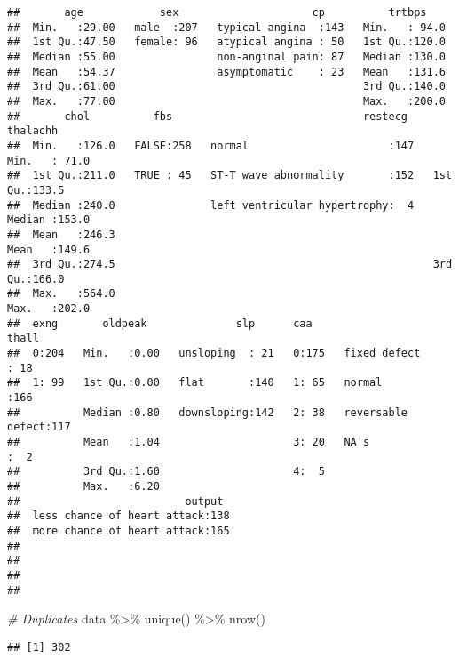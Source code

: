 \documentclass[
]{article}
\newenvironment{Shaded}{\begin{snugshade}}{\end{snugshade}}
\newcommand{\CommentTok}[1]{\textcolor[rgb]{0.56,0.35,0.01}{\textit{#1}}}
\newcommand{\FunctionTok}[1]{\textcolor[rgb]{0.00,0.00,0.00}{#1}}
\newcommand{\NormalTok}[1]{#1}
\newcommand{\SpecialCharTok}[1]{\textcolor[rgb]{0.00,0.00,0.00}{#1}}
\begin{document}
\begin{verbatim}
##       age            sex                     cp          trtbps     
##  Min.   :29.00   male  :207   typical angina  :143   Min.   : 94.0  
##  1st Qu.:47.50   female: 96   atypical angina : 50   1st Qu.:120.0  
##  Median :55.00                non-anginal pain: 87   Median :130.0  
##  Mean   :54.37                asymptomatic    : 23   Mean   :131.6  
##  3rd Qu.:61.00                                       3rd Qu.:140.0  
##  Max.   :77.00                                       Max.   :200.0  
##       chol          fbs                              restecg       thalachh    
##  Min.   :126.0   FALSE:258   normal                      :147   Min.   : 71.0  
##  1st Qu.:211.0   TRUE : 45   ST-T wave abnormality       :152   1st Qu.:133.5  
##  Median :240.0               left ventricular hypertrophy:  4   Median :153.0  
##  Mean   :246.3                                                  Mean   :149.6  
##  3rd Qu.:274.5                                                  3rd Qu.:166.0  
##  Max.   :564.0                                                  Max.   :202.0  
##  exng       oldpeak              slp      caa                   thall    
##  0:204   Min.   :0.00   unsloping  : 21   0:175   fixed defect     : 18  
##  1: 99   1st Qu.:0.00   flat       :140   1: 65   normal           :166  
##          Median :0.80   downsloping:142   2: 38   reversable defect:117  
##          Mean   :1.04                     3: 20   NA's             :  2  
##          3rd Qu.:1.60                     4:  5                          
##          Max.   :6.20                                                    
##                          output   
##  less chance of heart attack:138  
##  more chance of heart attack:165  
##                                   
##                                   
##                                   
## 
\end{verbatim}

\begin{Shaded}
\begin{Highlighting}[]
\CommentTok{\# Duplicates}
\NormalTok{data }\SpecialCharTok{\%\textgreater{}\%} 
  \FunctionTok{unique}\NormalTok{() }\SpecialCharTok{\%\textgreater{}\%} 
  \FunctionTok{nrow}\NormalTok{()}
\end{Highlighting}
\end{Shaded}

\begin{verbatim}
## [1] 302
\end{verbatim}
\end{document}
